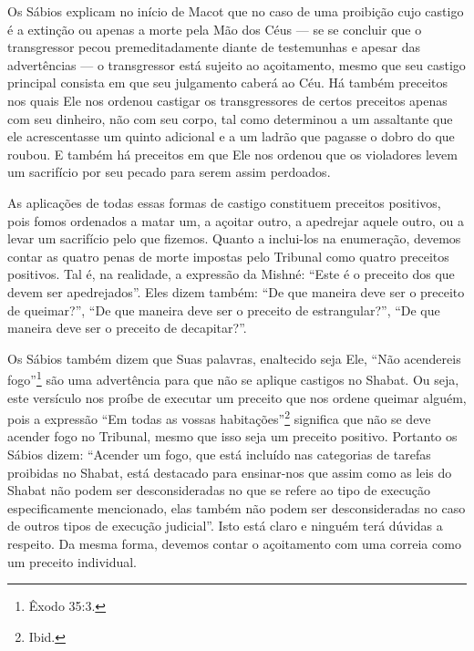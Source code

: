 Os Sábios explicam no início de Macot que no caso de uma proibição cujo
castigo é a extinção ou apenas a morte pela Mão dos Céus --- se se
concluir que o transgressor pecou premeditadamente diante de testemunhas
e apesar das advertências --- o transgressor está sujeito ao
açoitamento, mesmo que seu castigo principal consista em que seu
julgamento caberá ao Céu. Há também preceitos nos quais Ele nos ordenou
castigar os transgressores de certos preceitos apenas com seu dinheiro,
não com seu corpo, tal como determinou a um assaltante que ele acrescentasse um quinto adicional e a um
ladrão que pagasse o dobro do que roubou. E também há preceitos em que
Ele nos ordenou que os violadores levem um sacrifício por seu pecado
para serem assim perdoados.

As aplicações de todas essas formas de castigo constituem preceitos
positivos, pois fomos ordenados a matar um, a açoitar outro, a apedrejar
aquele outro, ou a levar um sacrifício pelo que fizemos. Quanto a
inclui-los na enumeração, devemos contar as quatro penas de morte
impostas pelo Tribunal como quatro preceitos positivos. Tal é, na
realidade, a expressão da Mishné: ``Este é o preceito dos que devem ser
apedrejados''. Eles dizem também: ``De que maneira deve ser o preceito
de queimar?'', ``De que maneira deve ser o preceito de estrangular?'',
``De que maneira deve ser o preceito de decapitar?''.

Os Sábios também dizem que Suas palavras, enaltecido seja Ele, ``Não
acendereis fogo''\footnote{Êxodo 35:3.} são uma advertência para que não se
aplique castigos no Shabat. Ou seja, este versículo nos proíbe de
executar um preceito que nos ordene queimar alguém, pois a expressão
``Em todas as vossas habitações''\footnote{Ibid.} significa que não se deve
acender fogo no Tribunal, mesmo que isso seja um preceito positivo.
Portanto os Sábios dizem: ``Acender um fogo, que está incluído nas
categorias de tarefas proibidas no Shabat, está destacado para
ensinar-nos que assim como as leis do Shabat não podem ser
desconsideradas no que se refere ao tipo de execução especificamente
mencionado, elas também não podem ser desconsideradas no caso de outros
tipos de execução judicial''. Isto está claro e ninguém terá dúvidas a
respeito. Da mesma forma, devemos contar o açoitamento com uma correia
como um preceito individual.

